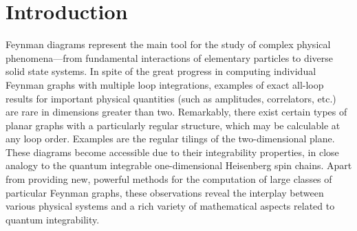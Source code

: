 \documentclass[twocolumn,preprintnumbers,prl,superscriptaddress]{revtex4-1}
\begin{document}
                              
\maketitle




\section{Introduction}\label{sec:intro}

Feynman diagrams represent the main tool for the  study of complex physical phenomena---from fundamental interactions of elementary particles to diverse solid state systems.  
In spite of the great progress in computing individual Feynman graphs with multiple loop integrations, 
examples of exact all-loop results for important physical quantities (such as amplitudes, correlators, etc.)   are rare in dimensions greater than two. 
Remarkably, there exist certain types of  planar graphs
with a particularly regular structure, which may be calculable at any loop order. Examples are the regular tilings of the two-dimensional plane. These diagrams become accessible due to their integrability properties, in close analogy to the quantum integrable one-dimensional Heisenberg spin chains.  Apart from providing new, powerful methods for the computation of large classes of particular Feynman graphs, these observations reveal the  interplay between various physical systems and a rich variety of mathematical aspects related to quantum integrability.                                   
\end{document}
